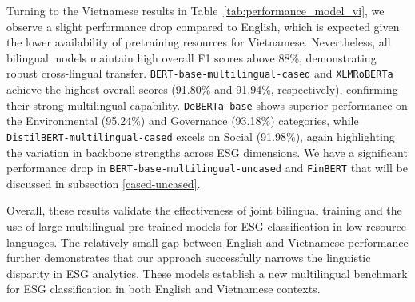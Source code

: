 \documentclass[12pt, letterpaper]{template}
\begin{document}
{{{\begin{table}[h]
\centering
\caption{F1 scores of models on each ESG category in the Vietnamese ViEn-ESG dataset.
}
\label{tab:performance_model_vi}
\end{table}


Turning to the Vietnamese results in Table~\ref{tab:performance_model_vi}, we observe a slight performance drop compared to English, which is expected given the lower availability of pretraining resources for Vietnamese. Nevertheless, all bilingual models maintain high overall F1 scores above 88\%, demonstrating robust cross-lingual transfer. \texttt{BERT-base-multilingual-cased} and \texttt{XLMRoBERTa} achieve the highest overall scores (91.80\% and 91.94\%, respectively), confirming their strong multilingual capability. \texttt{DeBERTa-base} shows superior performance on the Environmental (95.24\%) and Governance (93.18\%) categories, while \texttt{DistilBERT-multilingual-cased} excels on Social (91.98\%), again highlighting the variation in backbone strengths across ESG dimensions. We have a significant performance drop in \texttt{BERT-base-multilingual-uncased} and \texttt{FinBERT} that will be discussed in subsection \ref{cased-uncased}.

Overall, these results validate the effectiveness of joint bilingual training and the use of large multilingual pre-trained models for ESG classification in low-resource languages. The relatively small gap between English and Vietnamese performance further demonstrates that our approach successfully narrows the linguistic disparity in ESG analytics. These models establish a new multilingual benchmark for ESG classification in both English and Vietnamese contexts.

}}}
\end{document}
